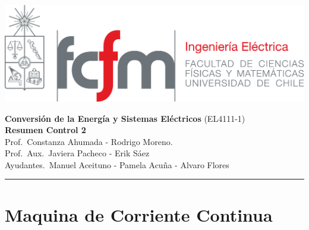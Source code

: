 \documentclass[
  11pt,
  letterpaper,
   addpoints,
   answers
  ]{exam}
\begin{document}
\noindent
\begin{minipage}{0.47\textwidth}
\includegraphics[width=\textwidth]{../fcfm_die}
\end{minipage}
\begin{minipage}{0.53\textwidth}
\begin{center} 
\large\textbf{Conversión de la Energía y Sistemas Eléctricos } (EL4111-1) \\
\large\textbf{Resumen Control 2} \\
\small Prof.~Constanza Ahumada - Rodrigo Moreno.\\
\small Prof.~Aux.~Javiera Pacheco - Erik Sáez\\
\small Ayudantes.~Manuel Aceituno - Pamela Acuña - Alvaro Flores\\
\end{center}
\end{minipage}

\vspace{0.5cm}
\noindent
\vspace{.85cm}
\hrule

\section*{Maquina de Corriente Continua}
\end{document}
